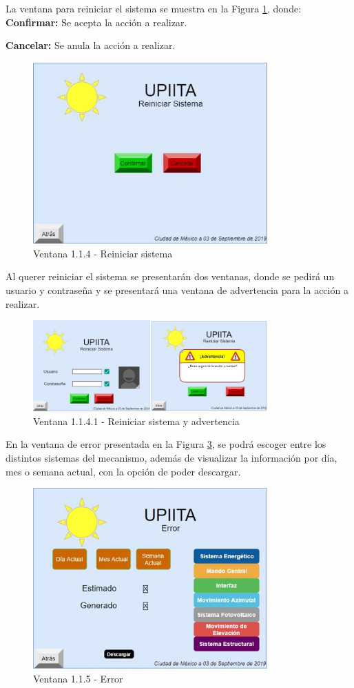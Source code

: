 La ventana para reiniciar el sistema se muestra en la Figura \ref{fig:v114}, donde:\\

\textbf{Confirmar:} Se acepta la acción a realizar.

\textbf{Cancelar:} Se anula la acción a realizar.
\begin{figure}[H]
	\centering
	\includegraphics[width=9cm]{imagenes/v114}
	\caption{Ventana 1.1.4 - Reiniciar sistema}
	\label{fig:v114}
\end{figure}

Al querer reiniciar el sistema se presentarán dos ventanas, donde se pedirá un usuario y contraseña y se presentará una ventana de advertencia para la acción a realizar.
\begin{figure}[H]
	\centering
	\includegraphics[width=9cm]{imagenes/v1141}
	\caption{Ventana 1.1.4.1 -  Reiniciar sistema y advertencia}
	\label{fig:v1141}
\end{figure}

En la ventana de error presentada en la Figura \ref{fig:v115}, se podrá escoger entre los distintos sistemas del mecanismo, además de visualizar la información por día, mes o semana actual, con la opción de poder descargar.
\begin{figure}[H]
	\centering
	\includegraphics[width=9cm]{imagenes/v115}
	\caption{Ventana 1.1.5 - Error}
	\label{fig:v115}
\end{figure}

